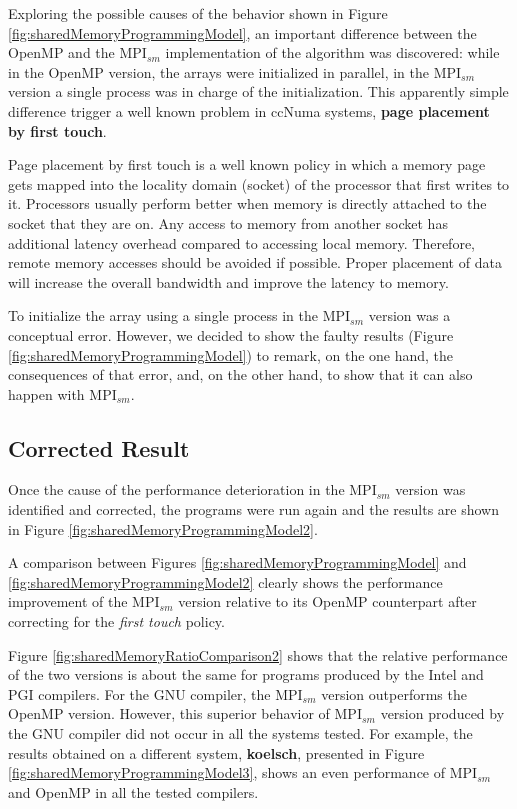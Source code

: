 Exploring the possible causes of the behavior shown in Figure \ref{fig:sharedMemoryProgrammingModel}, an important  difference between the OpenMP and the MPI$_{sm}$ implementation of the algorithm was discovered: while in the OpenMP version, the arrays were initialized in parallel, in the MPI$_{sm}$ version a single process was in charge of the initialization. This apparently simple difference trigger a well known problem in ccNuma systems, \textbf{page placement by first touch}. 

\medskip

Page placement by first touch is a well known policy in which a memory page gets mapped into the locality domain (socket) of the processor that first writes to it. Processors usually perform better when memory is directly attached to the socket that they are on. Any access to memory from another socket has additional latency overhead compared to accessing local memory. Therefore, remote memory accesses should be avoided if possible. Proper placement of data will increase the overall bandwidth and improve the latency to memory.

\medskip

To initialize the array using a single process in the MPI$_{sm}$ version was a conceptual error. However, we decided to show the faulty results (Figure \ref{fig:sharedMemoryProgrammingModel}) to remark, on the one hand, the consequences of that error, and, on the other hand, to show that it can also happen with MPI$_{sm}$.

\subsection*{Corrected Result}

Once the cause of the performance deterioration in the MPI$_{sm}$ version was identified and corrected, the programs were run again and the results are shown in Figure \ref{fig:sharedMemoryProgrammingModel2}.

\medskip

A comparison between Figures \ref{fig:sharedMemoryProgrammingModel} and \ref{fig:sharedMemoryProgrammingModel2} clearly shows the performance improvement of the MPI$_{sm}$ version relative to its OpenMP counterpart after correcting for the \emph{first touch} policy. 

\medskip

Figure \ref{fig:sharedMemoryRatioComparison2} shows that the relative performance of the two versions is about the same for programs produced by the Intel and PGI compilers. For the GNU compiler, the MPI$_{sm}$ version outperforms the OpenMP version. However, this superior behavior of MPI$_{sm}$ version produced by the GNU compiler did not occur in all the systems tested. For example, the results obtained on a different system, \textbf{koelsch}, presented in Figure \ref{fig:sharedMemoryProgrammingModel3}, shows an even performance of MPI$_{sm}$ and OpenMP in all the tested compilers.


